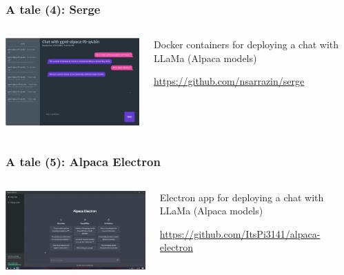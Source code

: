 \documentclass[17pt,aspectratio=169,hyperref={pdfusetitle,colorlinks,allcolors=olive}]{beamer}
\begin{document}
\begin{frame}[fragile]
  \frametitle{A tale (4): Serge}

  \begin{columns}[T]
    \begin{column}{.58\textwidth}
      \includegraphics[width=7.5cm]{figs/serge}
    \end{column}%
    \hfill%
    \begin{column}{.38\textwidth}
      \vspace{1.5cm}

      Docker containers for deploying a chat with LLaMa (Alpaca models)
      
    {\scriptsize
      \url{https://github.com/nsarrazin/serge}
    }
    \end{column}%
  \end{columns}

\end{frame}

\begin{frame}[fragile]
  \frametitle{A tale (5): Alpaca Electron}

  \begin{columns}[T]
    \begin{column}{.58\textwidth}
      \includegraphics[width=7.5cm]{figs/alpaca-electron}
    \end{column}%
    \hfill%
    \begin{column}{.38\textwidth}
      \vspace{1.5cm}

      Electron app for deploying a chat with LLaMa (Alpaca models)
      
    {\scriptsize
      \url{https://github.com/ItsPi3141/alpaca-electron}
    }
    \end{column}%
  \end{columns}

\end{frame}
\end{document}
